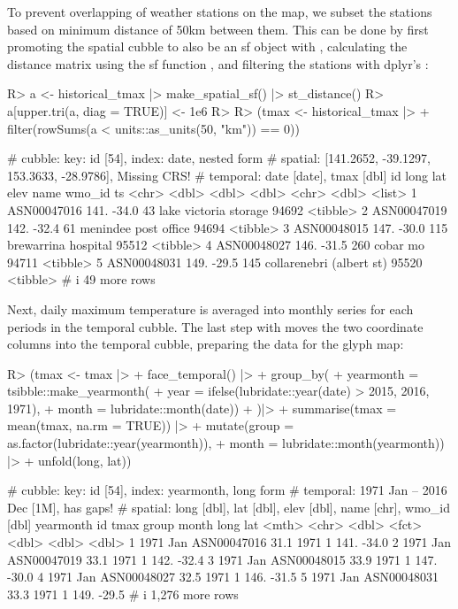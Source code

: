 \documentclass[
  shortnames]{jss}
\begin{document}
To prevent overlapping of weather stations on the map, we subset the stations based on minimum distance of 50km between them. This can be done by first promoting the spatial cubble to also be an sf object with , calculating the distance matrix using the sf function , and filtering the stations with dplyr's :

\begin{CodeChunk}
\begin{CodeInput}
R> a <- historical_tmax |> make_spatial_sf() |> st_distance()
R> a[upper.tri(a, diag = TRUE)] <- 1e6
R> 
R> (tmax <- historical_tmax |> 
+   filter(rowSums(a < units::as_units(50, "km")) == 0))
\end{CodeInput}
\begin{CodeOutput}
# cubble:   key: id [54], index: date, nested form
# spatial:  [141.2652, -39.1297, 153.3633, -28.9786], Missing CRS!
# temporal: date [date], tmax [dbl]
  id           long   lat  elev name                     wmo_id ts      
  <chr>       <dbl> <dbl> <dbl> <chr>                     <dbl> <list>  
1 ASN00047016  141. -34.0    43 lake victoria storage     94692 <tibble>
2 ASN00047019  142. -32.4    61 menindee post office      94694 <tibble>
3 ASN00048015  147. -30.0   115 brewarrina hospital       95512 <tibble>
4 ASN00048027  146. -31.5   260 cobar mo                  94711 <tibble>
5 ASN00048031  149. -29.5   145 collarenebri (albert st)  95520 <tibble>
# i 49 more rows
\end{CodeOutput}
\end{CodeChunk}

Next, daily maximum temperature is averaged into monthly series for each periods in the temporal cubble. The last step with  moves the two coordinate columns  into the temporal cubble, preparing the data for the glyph map:

\begin{CodeChunk}
\begin{CodeInput}
R> (tmax <- tmax |>
+   face_temporal() |> 
+   group_by(
+     yearmonth = tsibble::make_yearmonth(
+       year = ifelse(lubridate::year(date) > 2015, 2016, 1971),
+       month = lubridate::month(date))
+   )|>
+   summarise(tmax = mean(tmax, na.rm = TRUE)) |> 
+   mutate(group = as.factor(lubridate::year(yearmonth)),
+          month = lubridate::month(yearmonth)) |> 
+   unfold(long, lat))
\end{CodeInput}
\begin{CodeOutput}
# cubble:   key: id [54], index: yearmonth, long form
# temporal: 1971 Jan -- 2016 Dec [1M], has gaps!
# spatial:  long [dbl], lat [dbl], elev [dbl], name [chr], wmo_id [dbl]
  yearmonth id           tmax group month  long   lat
      <mth> <chr>       <dbl> <fct> <dbl> <dbl> <dbl>
1  1971 Jan ASN00047016  31.1 1971      1  141. -34.0
2  1971 Jan ASN00047019  33.1 1971      1  142. -32.4
3  1971 Jan ASN00048015  33.9 1971      1  147. -30.0
4  1971 Jan ASN00048027  32.5 1971      1  146. -31.5
5  1971 Jan ASN00048031  33.3 1971      1  149. -29.5
# i 1,276 more rows
\end{CodeOutput}
\end{CodeChunk}
\end{document}
